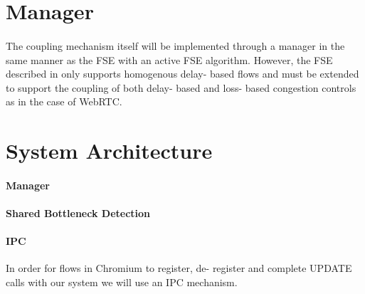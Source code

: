 \section{Manager}
\paragraph{}
The coupling mechanism itself will be implemented through a manager in the same manner as the FSE with an active FSE algorithm. 
However, the FSE described in \cite{rfc8699} only supports homogenous delay- based flows and must be extended to support the coupling of both delay- based and loss- based congestion controls as in the case of WebRTC. 

\section{System Architecture}
\paragraph{Manager}
\paragraph{Shared Bottleneck Detection}
\paragraph{IPC}
In order for flows in Chromium to register, de- register and complete UPDATE calls with our system we will use an IPC mechanism.

